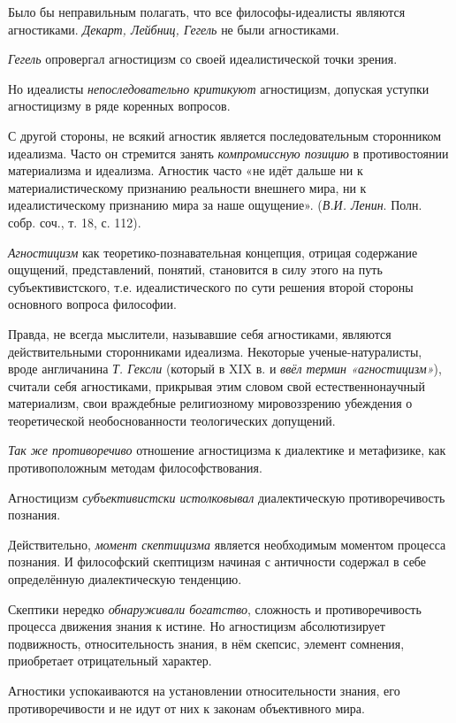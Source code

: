 \documentclass[a4paper,14pt,russian]{extreport}
\begin{document}
Было бы неправильным полагать, что все философы-идеалисты являются агностиками. \emph{Декарт, Лейбниц, Гегель} не были агностиками.

\emph{Гегель} опровергал агностицизм со своей идеалистической точки зрения.

Но идеалисты \emph{непоследовательно критикуют} агностицизм, допуская уступки агностицизму в ряде коренных вопросов.

С другой стороны, не всякий агностик является последовательным сторонником идеализма. Часто он стремится занять \emph{компромиссную позицию} в противостоянии материализма и идеализма. Агностик часто «не идёт дальше ни к материалистическому признанию реальности внешнего мира, ни к идеалистическому признанию мира за наше ощущение». (\emph{В.И. Ленин}. Полн. собр. соч., т. 18, с. 112).

\emph{Агностицизм} как теоретико-познавательная концепция, отрицая содержание ощущений, представлений, понятий, становится в силу этого на путь субъективистского, т.е. идеалистического по сути решения второй стороны основного вопроса философии.

Правда, не всегда мыслители, называвшие себя агностиками, являются действительными сторонниками идеализма. Некоторые ученые-натуралисты, вроде англичанина \emph{Т. Гексли} (который в XIX в. и \emph{ввёл термин «агностицизм»}), считали себя агностиками, прикрывая этим словом свой естественнонаучный материализм, свои враждебные религиозному мировоззрению убеждения о теоретической необоснованности теологических допущений.

\emph{Так же противоречиво} отношение агностицизма к диалектике и метафизике, как противоположным методам философствования.

Агностицизм \emph{субъективистски истолковывал} диалектическую противоречивость познания.

Действительно, \emph{момент скептицизма} является необходимым моментом процесса познания. И философский скептицизм начиная с античности содержал в себе определённую диалектическую тенденцию.

Скептики нередко \emph{обнаруживали богатство}, сложность и противоречивость процесса движения знания к истине. Но агностицизм абсолютизирует подвижность, относительность знания, в нём скепсис, элемент сомнения, приобретает отрицательный характер.

Агностики успокаиваются на установлении относительности знания, его противоречивости и не идут от них к законам объективного мира.
\end{document}
